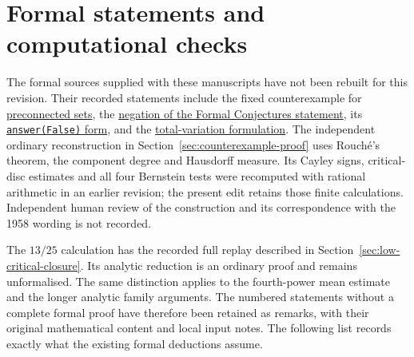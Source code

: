 \documentclass[11pt]{article}
\begin{document}
\section{Formal statements and computational checks}\label{sec:verification-notes}

The formal sources supplied with these manuscripts have not been rebuilt
for this revision. Their recorded statements include the fixed
counterexample for
\href{https://github.com/wcook04/plectis-erdos/blob/7380b7871687b6bcc41ca0143c61f232e8af6500/lean/ErdosProblems/Erdos1041/Counterexample/HausdorffLength.lean\#L283}{preconnected sets},
the
\href{https://github.com/wcook04/plectis-erdos/blob/7380b7871687b6bcc41ca0143c61f232e8af6500/lean/ErdosProblems/Erdos1041/Counterexample/HausdorffLength.lean\#L407}{negation of the Formal Conjectures statement},
its
\href{https://github.com/wcook04/plectis-erdos/blob/7380b7871687b6bcc41ca0143c61f232e8af6500/lean/ErdosProblems/Erdos1041/Counterexample/HausdorffLength.lean\#L449}{\texttt{answer(False)} form},
and the
\href{https://github.com/wcook04/plectis-erdos/blob/f70679d47178bf1174309cb29f5b31748609cc04/lean/ErdosProblems/Erdos1041/Counterexample/CatalogueAdapter.lean\#L25}{total-variation formulation}.
The independent ordinary reconstruction in
Section~\ref{sec:counterexample-proof} uses Rouch\'e's theorem, the
component degree and Hausdorff measure. Its Cayley signs, critical-disc
estimates and all four Bernstein tests were recomputed with rational
arithmetic in an earlier revision; the present edit retains those
finite calculations. Independent human review of the construction and its
correspondence with the 1958 wording is not recorded.

The $13/25$ calculation has the recorded full replay described in
Section~\ref{sec:low-critical-closure}. Its analytic reduction is an
ordinary proof and remains unformalised. The same distinction applies
to the fourth-power mean estimate and the longer analytic family
arguments. The numbered statements without a complete formal proof
have therefore been retained as remarks, with their original
mathematical content and local input notes. The following list records
exactly what the existing formal deductions assume.
\end{document}
